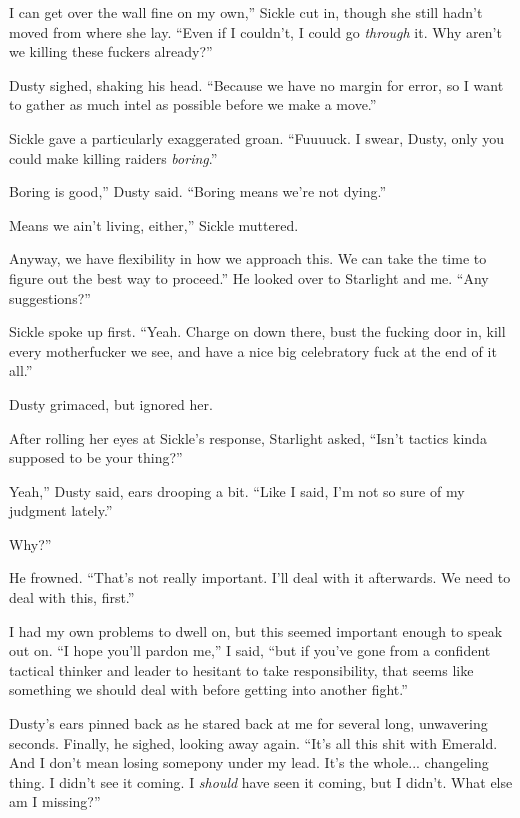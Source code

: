 \leavevmode{}I can get over the wall fine on my own,” Sickle cut in, though she still hadn’t moved from where she lay. “Even if I couldn’t, I could go \textit{through} it. Why aren’t we killing these fuckers already?”

Dusty sighed, shaking his head. “Because we have no margin for error, so I want to gather as much intel as possible before we make a move.”

Sickle gave a particularly exaggerated groan. “Fuuuuck. I swear, Dusty, only you could make killing raiders \textit{boring}.”

\leavevmode{}Boring is good,” Dusty said. “Boring means we’re not dying.”

\leavevmode{}Means we ain’t living, either,” Sickle muttered.

\leavevmode{}Anyway, we have flexibility in how we approach this. We can take the time to figure out the best way to proceed.” He looked over to Starlight and me. “Any suggestions?”

Sickle spoke up first. “Yeah. Charge on down there, bust the fucking door in, kill every motherfucker we see, and have a nice big celebratory fuck at the end of it all.”

Dusty grimaced, but ignored her.

After rolling her eyes at Sickle’s response, Starlight asked, “Isn’t tactics kinda supposed to be your thing?”

\leavevmode{}Yeah,” Dusty said, ears drooping a bit. “Like I said, I’m not so sure of my judgment lately.”

\leavevmode{}Why?”

He frowned. “That’s not really important. I’ll deal with it afterwards. We need to deal with this, first.”

I had my own problems to dwell on, but this seemed important enough to speak out on. “I hope you’ll pardon me,” I said, “but if you’ve gone from a confident tactical thinker and leader to hesitant to take responsibility, that seems like something we should deal with before getting into another fight.”

Dusty’s ears pinned back as he stared back at me for several long, unwavering seconds. Finally, he sighed, looking away again. “It’s all this shit with Emerald. And I don’t mean losing somepony under my lead. It’s the whole... changeling thing. I didn’t see it coming. I \textit{should} have seen it coming, but I didn’t. What else am I missing?”

